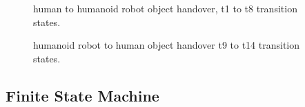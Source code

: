 \documentclass[a4paper, 12pt, oneside]{Thesis}  %
\begin{document}
\begin{figure}[hpt]
	\caption{human to humanoid robot object handover, t1 to t8 transition states.}
	\label{fig:h-to-r}
\end{figure}


\begin{figure}[hpt]
	\caption{humanoid robot to human object handover t9 to t14 transition states.}
	\label{fig:r-to-h}
\end{figure}


\subsection{Finite State Machine}\label{FSM}
\end{document}
